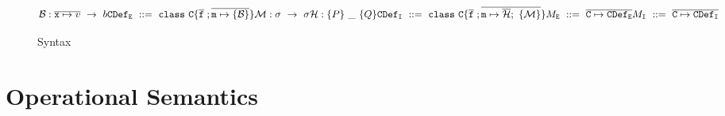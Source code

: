 \documentclass[12pt]{article}
\begin{document}
\begin{figure}[h]
\[	\mathcal{B} : \overline{\texttt{x} \mapsto v}\ \rightarrow\ b \\
	\texttt{CDef}_\texttt{E}\ ::=\ \texttt{class}\ \texttt{C} \{ 
		\overline{\texttt{f}}\; ; 
		\overline{\texttt{m} \mapsto \{ \mathcal{B}\}}
	\}\\
	\mathcal{M} : \sigma\ \rightarrow\ \sigma \\
	\mathcal{H} : \{P\}\ \_\ \{Q\}  \\
	\texttt{CDef}_\texttt{I}\ ::=\ \texttt{class}\ \texttt{C} \{ 
		\overline{\texttt{f}}\; ; 
		\overline{\texttt{m} \mapsto \overline{\mathcal{H}};\ \{\mathcal{M}\}}
	\}\\
	M_{\texttt{E}}\ ::=\ \overline{\texttt{C} \mapsto \texttt{CDef}_\texttt{E}}\\
	M_{\texttt{I}}\ ::=\ \overline{\texttt{C} \mapsto \texttt{CDef}_\texttt{I}}
	\]
	\caption{Syntax}
	\label{f:syntax}
	\end{figure}
	
	
	\section{Operational Semantics}
	
\end{document}

